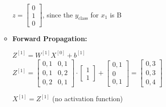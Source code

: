 \documentclass[12pt]{article}
\begin{document}
\begin{enumerate}[leftmargin=\labelsep, label=\textbf{\arabic*.)}]
\begin{itemize}
\begin{center}
                        \vspace{0.25cm}

                        $z = \begin{bmatrix}
                                0 \\
                                1 \\
                                0
                            \end{bmatrix}$, since the $y_\text{class}$ for $x_1$ is B

                        \vspace{0.25cm}
                    \end{center}
              \item \textbf{Forward Propagation:}
                    \begin{center}

                        \vspace{0.25cm}
                        $Z^{[1]}= W^{[1]}X^{[0]} + b^{[1]}$  \hspace{2em}
                        $Z^{[1]}= \begin{bmatrix}
                                0,1 & 0,1 \\
                                0,1 & 0,2 \\
                                0,2 & 0,1
                            \end{bmatrix} \cdot \begin{bmatrix}
                                1 \\
                                1
                            \end{bmatrix} + \begin{bmatrix}
                                0,1 \\
                                0   \\
                                0,1
                            \end{bmatrix} = \begin{bmatrix}
                                0,3 \\
                                0,3 \\
                                0,4
                            \end{bmatrix}$
                        \vspace{0.5em}

                        $X^{[1]} = Z^{[1]}$ (no activation function)
                        \vspace{0.5em}


\end{center}
\end{itemize}
\end{enumerate}
\end{document}
